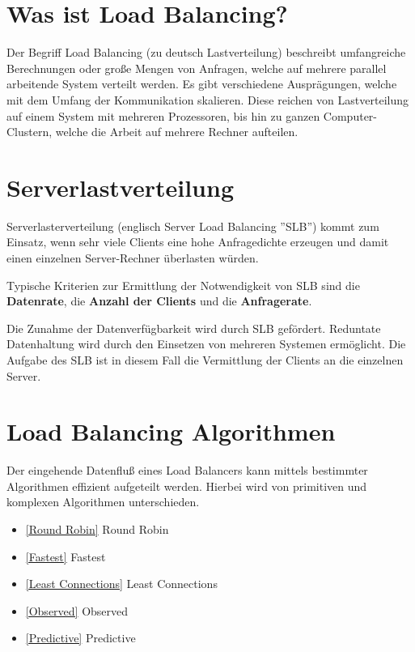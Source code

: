 


\section{Was ist Load Balancing?}\cite{Lastverteilung}
Der Begriff Load Balancing (zu deutsch Lastverteilung) beschreibt umfangreiche Berechnungen oder große Mengen von Anfragen, welche auf mehrere parallel arbeitende System verteilt werden. Es gibt verschiedene Ausprägungen, welche mit dem Umfang der Kommunikation skalieren. Diese reichen von
Lastverteilung auf einem System mit mehreren Prozessoren, bis hin zu ganzen Computer-Clustern, welche die Arbeit auf mehrere Rechner aufteilen.

\section{Serverlastverteilung}

Serverlasterverteilung (englisch Server Load Balancing ''SLB'') kommt zum Einsatz, wenn sehr viele Clients eine hohe Anfragedichte erzeugen und damit einen einzelnen Server-Rechner überlasten würden.\newline

Typische Kriterien zur Ermittlung der Notwendigkeit von SLB sind die \textbf{Datenrate}, die \textbf{Anzahl der Clients} und die \textbf{Anfragerate}. \newline

Die Zunahme der Datenverfügbarkeit wird durch SLB gefördert. Reduntate Datenhaltung wird durch den Einsetzen von mehreren Systemen ermöglicht. Die Aufgabe des SLB ist in diesem Fall die Vermittlung der Clients an die einzelnen Server. \newline

\section{Load Balancing Algorithmen}
\cite{LoadBalancingAlgorithmen}
Der eingehende Datenfluß eines Load Balancers kann mittels bestimmter Algorithmen effizient aufgeteilt werden. Hierbei wird von primitiven und komplexen Algorithmen unterschieden.
\begin{itemize}
	\item \ref{Round Robin} Round Robin
	\item \ref{Fastest} Fastest
	\item \ref{Least Connections} Least Connections
	\item \ref{Observed} Observed
	\item \ref{Predictive} Predictive
\end{itemize}

